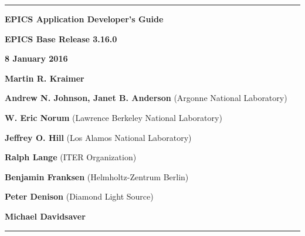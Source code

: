 \hrule

\vspace{1in}

\noindent \Huge \textbf{EPICS Application Developer's Guide}

\vspace{0.5in}

\noindent \Large \textbf{EPICS Base Release 3.16.0}

\noindent \textbf{8 January 2016}

\vspace{0.5in}

\normalsize
\noindent \textbf{Martin R. Kraimer}

\noindent \textbf{Andrew N. Johnson, Janet B. Anderson} (Argonne National Laboratory)

\noindent \textbf{W. Eric Norum} (Lawrence Berkeley National Laboratory)

\noindent \textbf{Jeffrey O. Hill} (Los Alamos National Laboratory)

\noindent \textbf{Ralph Lange} (ITER Organization)

\noindent \textbf{Benjamin Franksen} (Helmholtz-Zentrum Berlin)

\noindent \textbf{Peter Denison} (Diamond Light Source)

\noindent \textbf{Michael Davidsaver}

\vspace{1in}
\hrule
